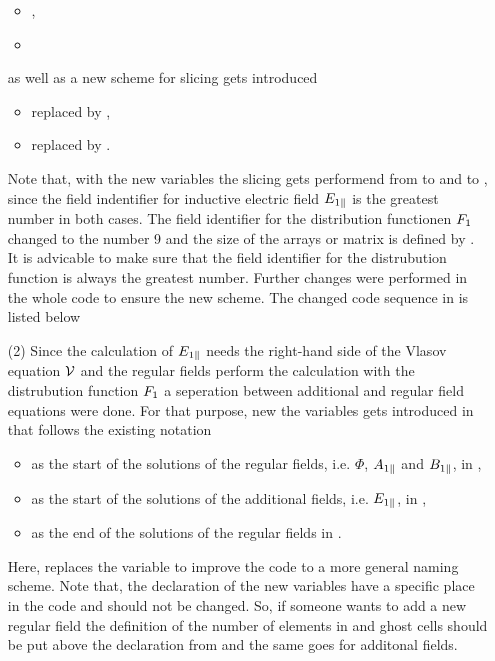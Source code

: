 \begin{enumerate}
    \begin{itemize}
        \item {}, 
        \item {}
    \end{itemize}
    as well as a new scheme for slicing gets introduced 
    \begin{itemize}
        \item {} replaced by , 
        \item {} replaced by .
    \end{itemize}
    Note that, with the new variables the slicing gets performend from  to  and  to , since the field indentifier for inductive electric field $E_{1\parallel}$ is the greatest number in both cases.
    The field identifier for the distribution functionen $F_1$ changed to the number 9 and the size of the arrays or matrix is defined by . It is advicable to make sure that the field identifier for the distrubution function is always the greatest number. Further changes were performed in the whole code to ensure the new scheme. The changed code sequence in  is listed below
    
    \item[(2)] Since the calculation of $E_{1\parallel}$ needs the right-hand side of the Vlasov equation $\mathcal{V}$ and the regular fields perform the calculation with the distrubution function $F_1$ a seperation between additional and regular field equations were done. For that purpose, new the variables gets introduced in  that follows the existing notation 
    \begin{itemize}
        \item {} as the start of the solutions of the regular fields, i.e. $\Phi$, $A_{1\parallel}$ and $B_{1\parallel}$, in ,
        \item {} as the start of the solutions of the additional fields, i.e. $E_{1\parallel}$, in ,
        \item {} as the end of the solutions of the regular fields in .
    \end{itemize}
    Here,  replaces the variable  to improve the code to a more general naming scheme. Note that, the declaration of the new variables have a specific place in the code and should not be changed. So, if someone wants to add a new regular field the definition of the number of elements in  and ghost cells should be put above the declaration from  and  the same goes for additonal fields. 

\end{enumerate}
